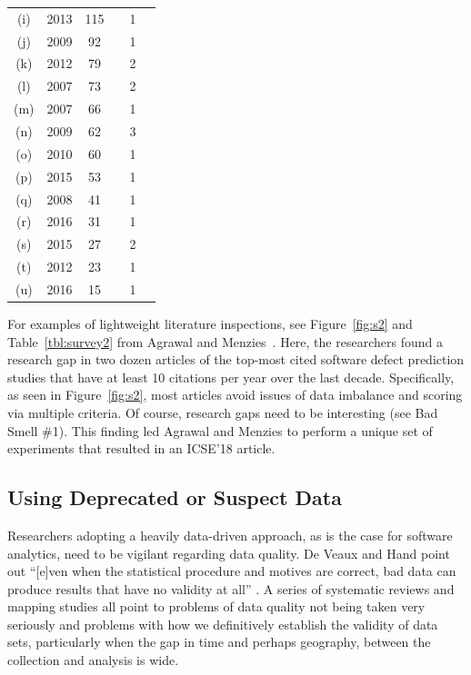 \documentclass[10pt]{elsarticle}
\newcommand{\cmark}{\ding{51}}%
\newcommand{\xmark}{\ding{55}}%
\newcommand{\RED}{\color{black}}
\newcommand{\BLACK}{\color{black}}
\begin{document}
\begin{table}[!t]
\begin{tabular}{c|c|c|c|c|c}
         (i)& 2013 & 115 & \cmark & 1 & \cmark \\  
       (j) & 2009 & 92 & \cmark & 1 & \xmark \\          
        (k) & 2012 & 79 & \cmark & 2 & \xmark  \\ 
         (l) & 2007 & 73 & \xmark & 2 & \cmark\\  
         (m)& 2007 & 66 & \xmark & 1 & \cmark \\  
       (n) & 2009 & 62 & \cmark & 3 & \xmark  \\ 
   (o)& 2010 & 60 & \cmark & 1 & \cmark  \\  
        (p) & 2015 & 53 & \cmark & 1 & \xmark  \\  
         (q) & 2008 & 41 & \cmark & 1 & \xmark  \\  
         (r) & 2016 & 31 & \cmark & 1 & \xmark  \\ 
       (s) & 2015 & 27 & \xmark & 2 & \cmark \\  
        (t) & 2012 & 23 & \xmark & 1 & \cmark \\  
        (u) & 2016 & 15 & \cmark & 1 & \xmark  
\end{tabular}
\vspace{-0.3cm}
\end{table}



For examples of lightweight literature inspections, see Figure~\ref{fig:s2} and Table~\ref{tbl:survey2} from Agrawal and Menzies~\cite{agrawal18}. Here, the researchers found a research gap in two dozen articles of the top-most cited software defect prediction studies that have at least 10 citations per year over the last decade. Specifically, as seen in Figure~\ref{fig:s2}, most articles avoid issues of data imbalance and scoring via multiple criteria.  \RED Of course, research gaps need to be interesting (see Bad Smell \#1). \BLACK This finding led Agrawal and Menzies to perform a unique set of experiments that resulted in an ICSE'18 article.  



\subsection{Using Deprecated or Suspect Data}

Researchers adopting a heavily data-driven approach, as is the case for software analytics, need to be vigilant regarding data quality.  De Veaux and Hand point out ``[e]ven when the statistical procedure and motives are correct, bad data can produce results that have no validity at all'' \cite{DeVe05}.  A series of systematic reviews and mapping studies \cite{Lieb08,Bosu13,Rosl13,Lieb16} all point to problems of data quality not being taken very seriously and problems with how we definitively establish the validity of data sets, particularly when the gap in time and perhaps geography, between the collection and analysis is wide.
\end{document}
